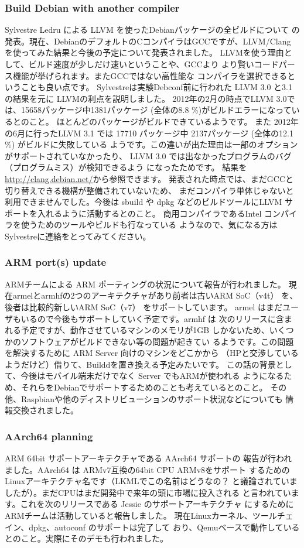 \documentclass[mingoth,a4paper]{jsarticle}
\begin{document}
\subsubsection{Build Debian with another compiler}
Sylvestre Ledru による LLVM を使ったDebianパッケージの全ビルドについて
の発表。現在、DebianのデフォルトのCコンパイラはGCCですが、LLVM/Clang 
を使ってみた結果と今後の予定について発表されました。
LLVMを使う理由として、ビルド速度が少しだけ速いということや、GCCより
より賢いコードパース機能が挙げられます。またGCCではない高性能な
コンパイラを選択できるということも良い点です。
Sylvestreは実験Debconf前に行われた LLVM 3.0 と3.1 の結果を元に
LLVMの利点を説明しました。
2012年の2月の時点でLLVM 3.0では、15658パッケージ中1381パッケージ 
(全体の8.8 \%)がビルドエラーになっているとのこと。
ほとんどのパッケージがビルドできているようです。
また 2012年の6月に行ったLLVM 3.1 では
17710 パッケージ中 2137パッケージ (全体の12.1 \%) がビルドに失敗している
ようです。この違いが出た理由は一部のオプションがサポートされていなかったり、
LLVM 3.0 では出なかったプログラムのバグ（プログラムミス）が検知できるよう
になったためです。
結果を\url{http://clang.debian.net/}から参照できます。
発表された時点では、まだGCCと切り替えできる機構が整備されていないため、
まだコンパイラ単体じゃないと利用できませんでした。今後は sbuild や dpkg
などのビルドツールにLLVM サポートを入れるように活動するとのこと。
商用コンパイラであるIntel コンパイラを使うためのツールやビルドも行なっている
ようなので、気になる方はSylvestreに連絡をとってみてください。
 
\subsubsection{ARM port(s) update}
ARMチームによる ARM ポーティングの状況について報告が行われました。
現在armelとarmhfの2つのアーキテクチャがあり前者は古いARM SoC（v4t）
を、後者は比較的新しいARM SoC（v7） をサポートしています。
armel はまだユーザもいるので今後もサポートしていく予定です。armhf は
次のリリースに含まれる予定ですが、動作させているマシンのメモリが1GB
しかないため、いくつかのソフトウェアがビルドできない等の問題が起きてい
るようです。この問題を解決するために ARM Server 向けのマシンをどこかから
（HPと交渉しているようだけど）借りて、Builddを置き換える予定みたいです。
この話の背景として、今後はモバイル端末だけでなく Server でもARMが使われる
ようになるため、それらをDebianでサポートするためのことも考えているとのこと。
その他、Raspbianや他のディストリビューションのサポート状況などについても
情報交換されました。

\subsubsection{AArch64 planning}
ARM 64bit サポートアーキテクチャである AArch64 サポートの
報告が行われました。AArch64 は ARMv7互換の64bit CPU ARMv8をサポート
するためのLinuxアーキテクチャ名です（LKMLでこの名前はどうなの？
と議論されていましたが）。まだCPUはまだ開発中で来年の頭に市場に投入される
と言われています。これを次のリリースである Jessie のサポートアーキテクチャ
にするためにARMチームは活動していると報告しました。
現在Linuxカーネル、ツールチェイン、dpkg、autoconf のサポートは完了して
おり、Qemuベースで動作しているとのこと。実際にそのデモも行われました。
\end{document}
